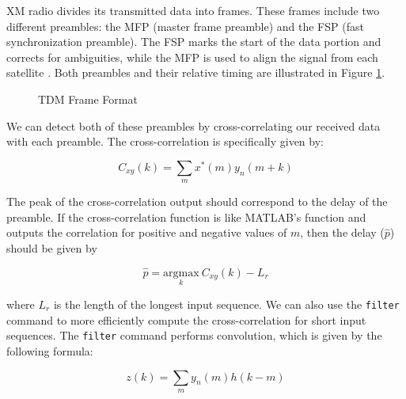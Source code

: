 \documentclass[conference,onecolumn]{IEEEtran}
\begin{document}
XM radio divides its transmitted data into frames. These frames include two different preambles: the MFP (master frame preamble) and the FSP (fast synchronization preamble). The FSP marks the start of the data portion and corrects for ambiguities, while the MFP is used to align the signal from each satellite \cite{a2008_us8260192b2}. Both preambles and their relative timing are illustrated in Figure \ref{fig::tdm_frame_format}.

\begin{figure}[H]
	\centerline{}
	\caption{TDM Frame Format \cite{a2008_us8260192b2}}
	\label{fig::tdm_frame_format}
\end{figure}

\noindent We can detect both of these preambles by cross-correlating our received data with each preamble. The cross-correlation is specifically given by:

\begin{equation}
	C_{xy}(k) = \sum_m{x^*(m)y_n(m+k)}
\end{equation}

\noindent The peak of the cross-correlation output should correspond to the delay of the preamble. If the cross-correlation function is like MATLAB's  function and outputs the correlation for positive and negative values of $m$, then the delay ($\hat{p}$) should be given by

\begin{equation}
	\hat{p} =  \underset{k}{\text{argmax}}\ C_{xy}(k) - L_r
\end{equation}

\noindent where $L_r$ is the length of the longest input sequence. We can also use the \texttt{filter} command to more efficiently compute the cross-correlation for short input sequences. The \texttt{filter} command performs convolution, which is given by the following formula:

\begin{equation}
	z(k) = \sum_{m}{y_n(m)h(k - m)}
\end{equation}
\end{document}
